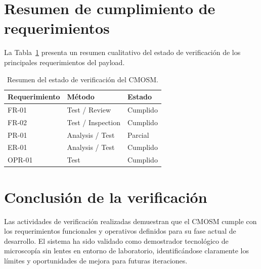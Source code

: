 \section{Resumen de cumplimiento de requerimientos}

La Tabla~\ref{tab:verificacion-resumen} presenta un resumen cualitativo del estado
de verificación de los principales requerimientos del payload.

\begin{table}[H]
\centering
\begin{tabular}{p{3cm} p{7cm} p{2.5cm}}
\toprule
\textbf{Requerimiento} & \textbf{Método} & \textbf{Estado} \\
\midrule
FR-01 & Test / Review & Cumplido \\
FR-02 & Test / Inspection & Cumplido \\
PR-01 & Analysis / Test & Parcial \\
ER-01 & Analysis / Test & Cumplido \\
OPR-01 & Test & Cumplido \\
\bottomrule
\end{tabular}
\caption{Resumen del estado de verificación del CMOSM.}
\label{tab:verificacion-resumen}
\end{table}

\section{Conclusión de la verificación}

Las actividades de verificación realizadas demuestran que el CMOSM cumple con los
requerimientos funcionales y operativos definidos para su fase actual de
desarrollo. El sistema ha sido validado como demostrador tecnológico de
microscopía sin lentes en entorno de laboratorio, identificándose claramente los
límites y oportunidades de mejora para futuras iteraciones.
